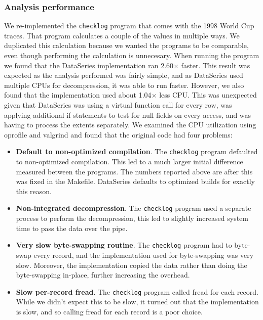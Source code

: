 \subsubsection{Analysis performance}


We re-implemented the {\tt checklog} program that comes with the 1998
World Cup traces.  That program calculates a couple of the values in
multiple ways.  We duplicated this calculation because we wanted the
programs to be comparable, even though performing the calculation is
unnecesary. When running the program we found that the DataSeries
implementation ran 2.60$\times$ faster.  This result was expected as
the analysis performed was fairly simple, and as DataSeries used
multiple CPUs for decompression, it was able to run faster.  However,
we also found that the implementation used about 1.04$\times$ less
CPU.  This was unexpected given that DataSeries was using a virtual
function call for every row, was applying additional if statements to
test for null fields on every access, and was having to process the
extents separately.  We examined the CPU utilization using oprofile
and valgrind and found that the original code had four problems:

\begin{itemize}

\item {\bf Default to non-optimized compilation}. The {\tt checklog}
program defaulted to non-optimized compilation.  This led to a much
larger initial difference measured between the programs.  The numbers
reported above are after this was fixed in the Makefile.  DataSeries
defaults to optimized builds for exactly this reason.

\item {\bf Non-integrated decompression}.  The {\tt checklog} program
used a separate process to perform the decompression, this led to
slightly increased system time to pass the data over the pipe.

\item {\bf Very slow byte-swapping routine}.  The {\tt checklog} program
had to byte-swap every record, and the implementation used for
byte-swapping was very slow.  Moreover, the implementation copied the
data rather than doing the byte-swapping in-place, further increasing
the overhead.

\item {\bf Slow per-record fread}.  The {\tt checklog} program called
fread for each record.  While we didn't expect this to be slow, it
turned out that the implementation is slow, and so calling fread for
each record is a poor choice.

\end{itemize}

